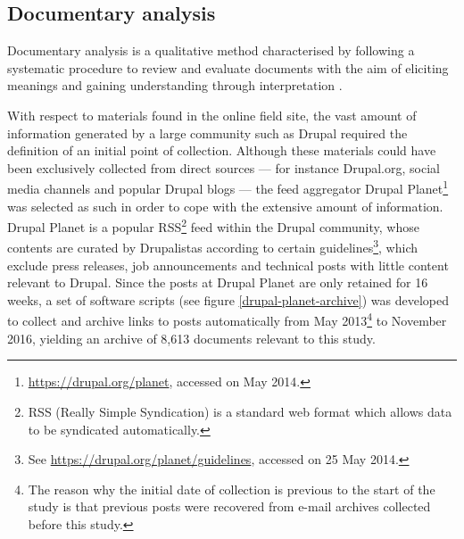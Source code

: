 \subsection{Documentary analysis}
\label{subsec:documentary-analysis}

Documentary analysis is a qualitative method characterised by following a systematic procedure to review and evaluate documents with the aim of eliciting meanings and gaining understanding through interpretation \parencite{bowen2009document}.

With respect to materials found in the online field site, the vast amount of information generated by a large community such as Drupal required the definition of an initial point of collection. Although these materials could have been exclusively collected from direct sources --- for instance Drupal.org, social media channels and popular Drupal blogs --- the feed aggregator Drupal Planet\footnote{\url{https://drupal.org/planet}, accessed on  May 2014.} was selected as such in order to cope with the extensive amount of information. Drupal Planet is a popular RSS\footnote{RSS (Really Simple Syndication) is a standard web format which allows data to be syndicated automatically.} feed within the Drupal community, whose contents are curated by Drupalistas according to certain guidelines\footnote{See \url{https://drupal.org/planet/guidelines}, accessed on 25 May 2014.}, which exclude press releases, job announcements and technical posts with little content relevant to Drupal. Since the posts at Drupal Planet are only retained for 16 weeks, a set of software scripts (see figure \ref{drupal-planet-archive}) was developed to collect and archive links to posts automatically from  May 2013\footnote{The reason why the initial date of collection is previous to the start of the study is that previous posts were recovered from e-mail archives collected before this study.} to  November 2016, yielding an archive of 8,613 documents relevant to this study.

